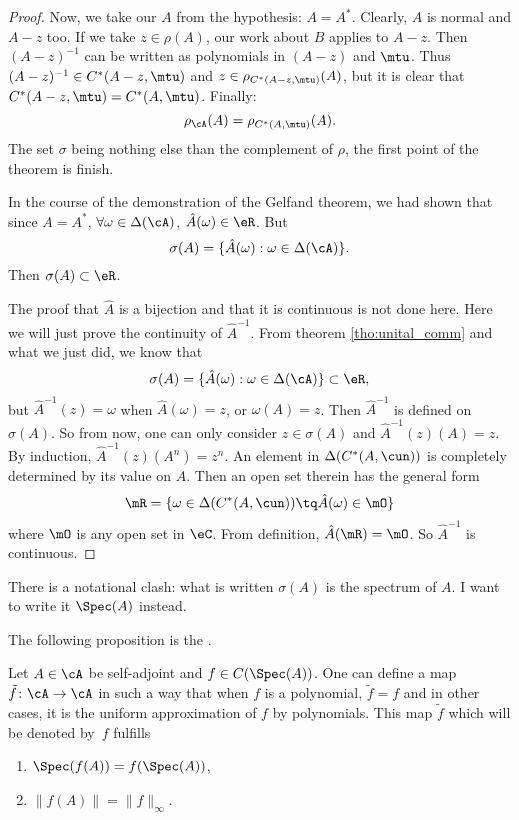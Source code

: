 \begin{proof}
Now, we take our $A$ from the hypothesis: $A=A^*$. Clearly, $A$ is normal and $A-z$ too. If we take $z\in\rho(A)$, our work about $B$ applies to $A-z$. Then $(A-z)^{-1}$ can be written as polynomials in $(A-z)$ and $\mtu$. Thus $(A-z)^{-1}\in C^*(A-z,\mtu)$ and
$z\in\rho_{C^*(A-z,\mtu)}(A)$, but it is clear that $C^*(A-z,\mtu)=C^*(A,\mtu)$. Finally:
\[
   \rho_{\cA}(A)=\rho_{C^*(A,\mtu)}(A).
\]
The set $\sigma$ being nothing else than the complement of $\rho$, the first point of the theorem is finish.

In the course of the demonstration of the Gelfand theorem, we had shown that since $A=A^*$, $\forall\omega\in\Delta(\cA)$, $\hat A(\omega)\in\eR$. But 
\[
   \sigma(A)=\{\hat A(\omega):\omega\in\Delta(\cA)\}.
\]
Then $\sigma(A)\subset\eR$.

The proof that $\hat A$ is a bijection and that it is continuous is not done here. Here we will just prove the continuity of $\hat A^{-1}$. From theorem \ref{tho:unital_comm} and what we just did, we know that
\[
   \sigma(A)=\{\hat A(\omega):\omega\in\Delta(\cA)\}\subset\eR,
\]
but $\hat A^{-1}(z)=\omega$ when $\hat A(\omega)=z$, or $\omega(A)=z$. Then $\hat A^{-1}$ is defined on $\sigma(A)$. So from now, one can only consider $z\in\sigma(A)$ and $\hat A^{-1}(z)(A)=z$. By induction, $\hat A^{-1}(z)(A^n)=z^n$. An element in $\Delta(C^*(A,\cun))$ is completely determined by its value on $A$. Then an open set therein has the general form
\[ 
  \mR=\{ \omega\in\Delta(C^*(A,\cun))\tq\hat A(\omega)\in\mO \}
\]
where $\mO$ is any open set in $\eC$. From definition, $\hat A(\mR)=\mO$. So $\hat A^{-1}$ is continuous.

\end{proof}


\begin{probleme}
    There is a notational clash: what is written $\sigma(A)$ is the spectrum of $A$. I want to write it $\Spec(A)$ instead.
\end{probleme}

The following proposition is the . 
\begin{theorem}     \label{ThoContFuncCalculus}
Let $A\in\cA$ be self-adjoint and $f\in C(\Spec(A))$. One can define a map $\tilde f\colon \cA\to \cA$ in such a way that when $f$ is a polynomial, $\tilde f=f$ and in other cases, it is the uniform approximation of $f$ by polynomials. This map $\tilde f$ which will be denoted by~$f$ fulfills
\begin{enumerate}
\item $\Spec(f(A))=f(\Spec(A))$,  \label{enuji}
\item $\|f(A)\|=\|f\|_{\infty}$.
\end{enumerate}\label{prop:cont_calc}
\end{theorem}

